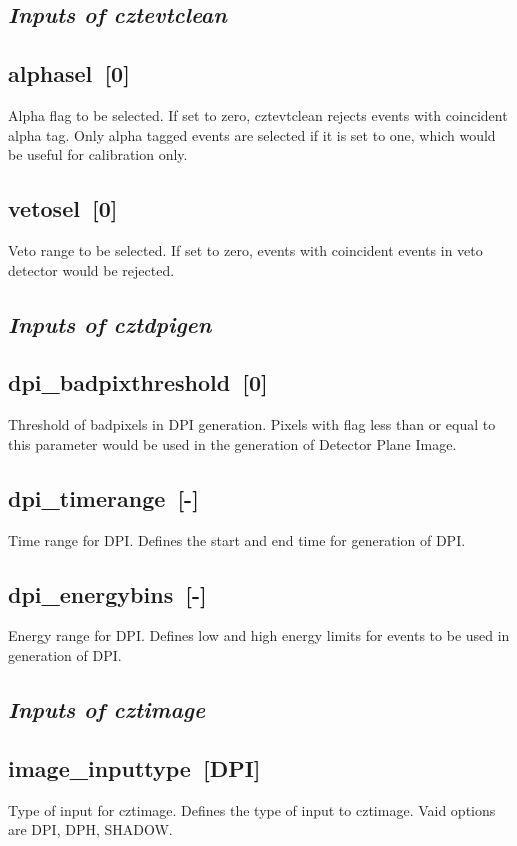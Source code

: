 \documentclass[11pt,oneside,a4paper]{article}
\begin{document}
\subsection*{\emph{Inputs of cztevtclean}}

\subsection*{alphasel~[0]}
    Alpha flag to be selected. If set to zero, cztevtclean rejects events with 
coincident alpha tag. Only alpha tagged events are selected if it is set to one,
which would be useful for calibration only. 
\subsection*{vetosel~[0]}   
    Veto range to be selected. If set to zero, events with coincident events in 
veto detector would be rejected. 
\subsection*{\emph{Inputs of cztdpigen}}

\subsection*{dpi\_badpixthreshold~[0]}
    Threshold of badpixels in DPI generation. Pixels with flag less than or equal to 
this parameter would be used in the generation of Detector Plane Image.
\subsection*{dpi\_timerange~[-]}
    Time range for DPI. Defines the start and end time for generation of 
DPI.
\subsection*{dpi\_energybins~[-]}
    Energy range for DPI. Defines low and high energy limits for events 
to be used in generation of DPI.
\subsection*{\emph{Inputs of cztimage}}
    
\subsection*{image\_inputtype~[DPI]}
    Type of input for cztimage. Defines the type of input to cztimage. 
Vaid options are DPI, DPH, SHADOW.
\end{document}
